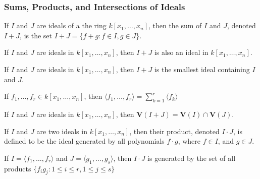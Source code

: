             \subsubsection{Sums, Products, and Intersections of Ideals}
                \begin{definition}
                    If $I$ and $J$ are ideals of a the ring
                    $k[x_1,\hdots ,x_n]$, then the sum of $I$ and $J$,
                    denoted $I+J$, is the set
                    $I+J=\{f+g: f\in I, g\in J\}$.
                \end{definition}
                \begin{theorem}
                    If $I$ and $J$ are ideals in $k[x_1,\hdots ,x_n]$,
                    then $I+J$ is also an ideal in $k[x_1,\hdots ,x_n]$.
                \end{theorem}
                \begin{theorem}
                    If $I$ and $J$ are ideals in $k[x_1,\hdots ,x_n]$,
                    then $I+J$ is the smallest ideal containing $I$ and $J$.
                \end{theorem}
                \begin{theorem}
                    If $f_1,\hdots, f_r \in k[x_1,\hdots ,x_n]$,
                    then
                    $\langle f_1,\hdots, f_r\rangle%
                     =\sum_{k=1}^{r}\langle f_k\rangle$
                \end{theorem}
                \begin{theorem}
                    If $I$ and $J$ are ideals in
                    $k[x_1,\hdots ,x_n]$, then
                    $\mathbf{V}(I+J)=\mathbf{V}(I)\cap\mathbf{V}(J)$.
                \end{theorem}
                \begin{definition}
                    If $I$ and $J$ are two ideals in
                    $k[x_1,\hdots ,x_n]$, then their product,
                    denoted $I\cdot J$, is defined to be the ideal
                    generated by all polynomials $f\cdot g$,
                    where $f\in I$, and $g\in J$.
                \end{definition}
                \begin{theorem}
                    If $I = \langle f_1,\hdots, f_r\rangle$ and
                    $J = \langle g_1,\hdots, g_s\rangle$, then
                    $I \cdot J$ is generated by the set of all
                    products
                    $\{f_ig_j:1\leq i\leq r, 1\leq j \leq s\}$
                \end{theorem}

